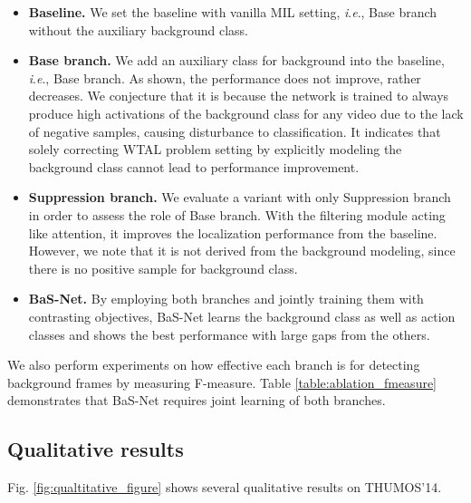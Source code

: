 \documentclass[letterpaper]{article} %
\newcommand{\ie}{\textit{i}.\textit{e}.}
\newcommand{\Fref}[1]{Fig. \ref{#1}}
\newcommand{\Tref}[1]{Table \ref{#1}}
\begin{document}
\begin{itemize}
    \item \textbf{Baseline.} We set the baseline with vanilla MIL setting, \ie, Base branch without the auxiliary background class.
    \item \textbf{Base branch.} We add an auxiliary class for background into the baseline, \ie, Base branch. As shown, the performance does not improve, rather decreases. We conjecture that it is because the network is trained to always produce high activations of the background class for any video due to the lack of negative samples, causing disturbance to classification. It indicates that solely correcting WTAL problem setting by explicitly modeling the background class cannot lead to performance improvement.
    \item \textbf{Suppression branch.} We evaluate a variant with only Suppression branch in order to assess the role of Base branch. With the filtering module acting like attention, it improves the localization performance from the baseline. However, we note that it is not derived from the background modeling, since there is no positive sample for background class.
    \item \textbf{BaS-Net.} By employing both branches and jointly training them with contrasting objectives, BaS-Net learns the background class as well as action classes and shows the best performance with large gaps from the others.
\end{itemize}

We also perform experiments on how effective each branch is for detecting background frames by measuring F-measure. \Tref{table:ablation_fmeasure} demonstrates that BaS-Net requires joint learning of both branches. 

\subsection{Qualitative results}
\Fref{fig:qualtitative_figure} shows several qualitative results on THUMOS'14.
\end{document}
